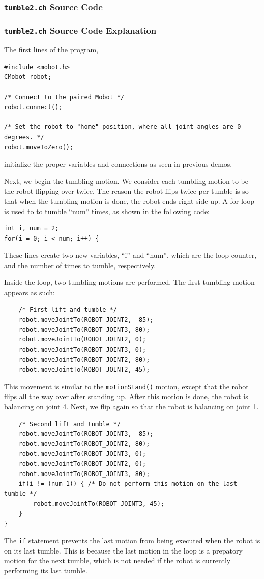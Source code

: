\documentclass{article}
\begin{document}
\subsubsection{\texttt{tumble2.ch} Source Code}

\subsubsection{\texttt{tumble2.ch} Source Code Explanation}
The first lines of the program,
\begin{verbatim}
#include <mobot.h>
CMobot robot;

/* Connect to the paired Mobot */
robot.connect();

/* Set the robot to "home" position, where all joint angles are 0 degrees. */
robot.moveToZero();
\end{verbatim}
initialize the proper variables and connections as seen in previous demos.

Next, we begin the tumbling motion. We consider each tumbling motion to be the 
robot flipping over twice. The reason the robot flips twice per tumble is so that
when the tumbling motion is done, the robot ends right side up. 
A for loop is used to to tumble ``num'' times, as shown in the following code:
\begin{verbatim}
int i, num = 2;
for(i = 0; i < num; i++) {
\end{verbatim}
These lines create two new variables, ``i'' and ``num'', which are the loop
counter, and the number of times to tumble, respectively. 

Inside the loop, two tumbling motions are performed. The first tumbling
motion appears as such:
\begin{verbatim}
    /* First lift and tumble */
    robot.moveJointTo(ROBOT_JOINT2, -85);
    robot.moveJointTo(ROBOT_JOINT3, 80);
    robot.moveJointTo(ROBOT_JOINT2, 0);
    robot.moveJointTo(ROBOT_JOINT3, 0);
    robot.moveJointTo(ROBOT_JOINT2, 80);
    robot.moveJointTo(ROBOT_JOINT2, 45);
\end{verbatim}
This movement is similar to the \texttt{motionStand()} motion, except that the
robot flips all the way over after standing up. After this motion is done,
the robot is balancing on joint 4. Next, we flip again so that the robot
is balancing on joint 1.
\begin{verbatim}
    /* Second lift and tumble */
    robot.moveJointTo(ROBOT_JOINT3, -85);
    robot.moveJointTo(ROBOT_JOINT2, 80);
    robot.moveJointTo(ROBOT_JOINT3, 0);
    robot.moveJointTo(ROBOT_JOINT2, 0);
    robot.moveJointTo(ROBOT_JOINT3, 80);
    if(i != (num-1)) { /* Do not perform this motion on the last tumble */
        robot.moveJointTo(ROBOT_JOINT3, 45);
    }
}
\end{verbatim}
The \texttt{if} statement prevents the last motion from being executed
when the robot is on its last tumble. This is because the last motion in the
loop is a prepatory motion for the next tumble, which is not needed if the
robot is currently performing its last tumble. 
\end{document}
